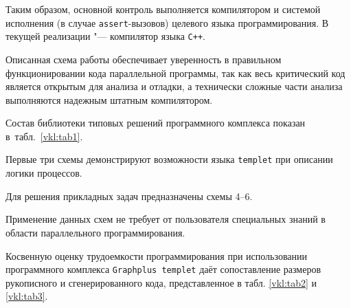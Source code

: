 Таким образом, основной контроль выполняется компилятором и системой исполнения (в случае {\tt assert}-вызовов) целевого языка программирования. В текущей реализации "--- компилятор языка {\tt C++}.



Описанная схема работы обеспечивает уверенность в правильном функционировании кода параллельной программы, так как весь критический код является открытым для анализа и отладки, а технически сложные части анализа выполняются надежным штатным компилятором.



Состав библиотеки типовых решений программного комплекса показан в~табл.~\ref{vkl:tab1}. 

Первые три схемы демонстрируют возможности языка {\tt templet} при описании логики процессов. 

Для решения прикладных задач предназначены схемы 4--6. 

Применение данных схем не требует от пользователя специальных знаний в области параллельного программирования.





Косвенную оценку трудоемкости программирования при использовании программного комплекса  {\tt Graphplus templet} даёт сопоставление размеров рукописного и сгенерированного кода, представленное в табл. \ref{vkl:tab2} и \ref{vkl:tab3}.



